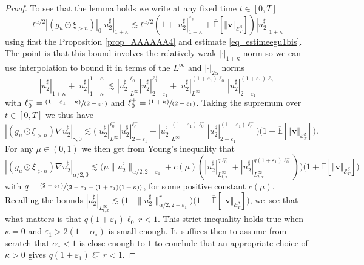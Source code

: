 \documentclass[10pt]{amsart}
\newcommand{\pspfrac}[2]{\sfrac{(#1)}{(#2)}}
\theoremstyle{definition}
\let\epsilon\varepsilon
\newcommand\bbE{\mathbb{E}}
\newcommand{\mcE}{\mathcal{E}}
\newcommand{\bsv}{\boldsymbol{v}}
\newcommand{\norme}[1]{\Vert #1 \Vert}
\begin{document}
\begin{proof}
To see that the lemma holds we write at any fixed time $t\in[0,T]$
\[
t^{\alpha / 2} | (g_u \odot \xi_{> n}) |_0 | u_2^{\sharp} |_{1 + \kappa} \lesssim t^{\alpha / 2} (1 + | u_2^{\sharp} |_{1 + \kappa}^{\epsilon_2} + \overline{\bbE}[\norme{\bsv}_{\mcE^\beta_T}] ) | u_2^{\sharp} |_{1 + \kappa}
\]
using first the Proposition \ref{prop_AAAAAA4} and estimate \eqref{eq_estimeegu1bis}. The point is that this bound involves the relatively weak $| \cdot |_{1 + \kappa}$ norm so we can use interpolation
to bound it in terms of the $L^{\infty}$ and $| \cdot |_{2 \alpha}$ norms
\[
| u_2^{\sharp} |_{1 + \kappa} + | u_2^{\sharp} |_{1 + \kappa}^{1 +
\epsilon_1} \lesssim | u_2^{\sharp} |_{L^{\infty}}^{\ell_0^-} |
u_2^{\sharp} |_{2 - \epsilon_1}^{\ell_0^+} + | u_2^{\sharp}
|_{L^{\infty}}^{(1 + \epsilon_1) \ell_0^-} | u_2^{\sharp} |_{2 -
\epsilon_1}^{(1 + \epsilon_1) \ell_0^+}
\]
with $\ell_0^- = \pspfrac{1 - \epsilon_1 - \kappa}{2 - \epsilon_1}$ and $\ell_0^+ = \pspfrac{1 + \kappa}{2 - \epsilon_1}$. Taking the supremum over $t\in[0,T]$ we thus have
\[
| (g_u \odot \xi_{> n}) \nabla u_2^{\sharp} |_{\gamma, 0} \lesssim \bigl( |
u_2^{\sharp} |_{L^{\infty}}^{\ell_0^-} | u_2^{\sharp} |_{2 -
\epsilon_1}^{\ell_0^+} + | u_2^{\sharp} |_{L^{\infty}}^{(1 + \epsilon_1)
\ell_0^-} | u_2^{\sharp} |_{2 - \epsilon_1}^{(1 + \epsilon_1) \ell_0^+}\bigr) \bigl(1+\overline{\bbE}[\norme{\bsv}_{\mcE^\beta_T}]\bigr).
\]
For any $\mu\in(0,1)$ we then get from Young's inequality that
\[
| (g_u \odot \xi_{> n}) \nabla u_2^{\sharp} |_{\alpha / 2, 0} \lesssim \bigl(\mu
\| u_2^{\sharp} \|_{\alpha / 2, 2 - \epsilon_1} + c (\mu) (| u_2^{\sharp}
|^{q \ell_0^-}_{L^{\infty}_{t, x}} + | u_2^{\sharp} |^{q (1 + \epsilon_1)
\ell_0^-}_{L^{\infty}_{t, x}}) \bigr) \bigl(1+\overline{\bbE}[\norme{\bsv}_{\mcE^\beta_T}]\bigr)
\]
with $q = \pspfrac{2 - \epsilon_1}{2 - \epsilon_1 - (1 + \epsilon_1) (1 + \kappa)}$, for some positive constant $c (\mu)$. Recalling the bounds $| u_2^{\sharp} |_{L^{\infty}_{t, x}} \lesssim \bigl(1 + \| u_2^{\sharp} \|^r_{\alpha / 2, 2 - \epsilon_1}\bigr) \bigl(1+\overline{\bbE}[\norme{\bsv}_{\mcE^\beta_T}]\bigr)$, we~see that what matters is that $q(1 + \epsilon_1) \ell_0^- r < 1$. This strict inequality holds true when $\kappa = 0$ and $\epsilon_1 > 2 (1 - \alpha_{\circ})$ is small enough. It~suffices then to assume from scratch that $\alpha_{\circ} < 1$ is close enough to $1$ to conclude that an appropriate choice of $\kappa > 0$ gives $q (1 + \epsilon_1) \ell_0^- r < 1$.
\end{proof}
\end{document}
